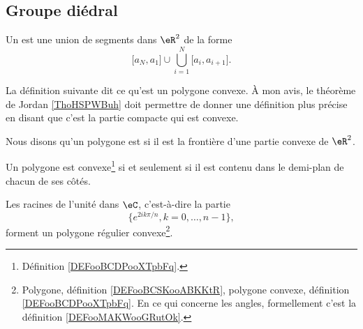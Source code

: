 \subsection{Groupe diédral}
\label{subsecHibJId}

\begin{definition}        \label{DEFooBCSKooABKKtR}
    Un  est une union de segments dans \( \eR^2\) de la forme 
    \begin{equation}
        \mathopen[ a_N , a_1 \mathclose]\cup\bigcup_{i=1}^N\mathopen[ a_i , a_{i+1} \mathclose].
    \end{equation}
\end{definition}

La définition suivante dit ce qu'est un polygone convexe. À mon avis, le théorème de Jordan \ref{ThoHSPWBuh} doit permettre de donner une définition plus précise en disant que c'est la partie compacte qui est convexe.
\begin{definition}      \label{DEFooBCDPooXTpbFq}
    Nous disons qu'un polygone est  si il est la frontière d'une partie convexe de \( \eR^2\).
\end{definition}

\begin{proposition}       \label{PROPooFYRMooTqVDEm}
    Un polygone est convexe\footnote{Définition \ref{DEFooBCDPooXTpbFq}.} si et seulement si il est contenu dans le demi-plan de chacun de ses côtés.
\end{proposition}

\begin{proposition}     \label{PROPooUPPTooZBFvPg}
	Les racines de l'unité dans \( \eC\), c'est-à-dire la partie
	\begin{equation}
		\{  e^{2ik\pi/n},k=0,\ldots, n-1 \},
	\end{equation}
    forment un polygone régulier convexe\footnote{Polygone, définition \ref{DEFooBCSKooABKKtR}, polygone convexe, définition \ref{DEFooBCDPooXTpbFq}. En ce qui concerne les angles, formellement c'est la définition \ref{DEFooMAKWooGRutOk}.}.
\end{proposition}

